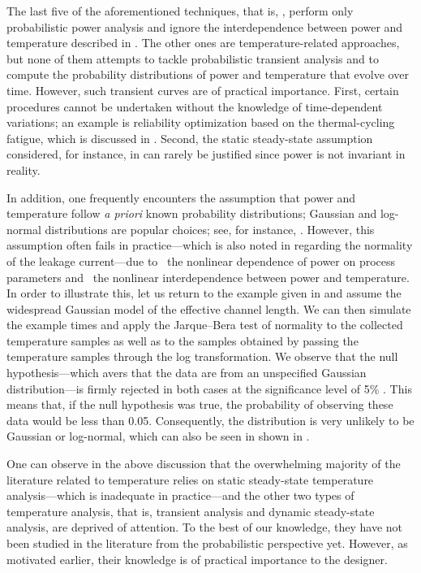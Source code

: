 The last five of the aforementioned techniques, that is, \cite{bhardwaj2006,
vrudhula2006, ghanta2006, bhardwaj2008, shen2009}, perform only probabilistic
power analysis and ignore the interdependence between power and temperature
described in . The other ones are temperature-related
approaches, but none of them attempts to tackle probabilistic transient analysis
and to compute the probability distributions of power and temperature that
evolve over time. However, such transient curves are of practical importance.
First, certain procedures cannot be undertaken without the knowledge of
time-dependent variations; an example is reliability optimization based on the
thermal-cycling fatigue, which is discussed in .
Second, the static steady-state assumption considered, for instance, in
\cite{huang2009a, juan2011, juan2012, lee2013} can rarely be justified since
power is not invariant in reality.

In addition, one frequently encounters the assumption that power and temperature
follow \emph{a priori} known probability distributions; Gaussian and log-normal
distributions are popular choices; see, for instance, \cite{bhardwaj2006,
srivastava2010, juan2012}. However, this assumption often fails in
practice---which is also noted in \cite{juan2012} regarding the normality of the
leakage current---due to \one~the nonlinear dependence of power on process
parameters and \two~the nonlinear interdependence between power and temperature.
In order to illustrate this, let us return to the example given in
 and assume the widespread Gaussian model of the
effective channel length. We can then simulate the example  times
and apply the Jarque--Bera test of normality to the collected temperature
samples as well as to the samples obtained by passing the temperature samples
through the log transformation. We observe that the null hypothesis---which
avers that the data are from an unspecified Gaussian distribution---is firmly
rejected in both cases at the significance level of 5\% \cite{rao2002}. This
means that, if the null hypothesis was true, the probability of observing these
data would be less than 0.05. Consequently, the distribution is very unlikely to
be Gaussian or log-normal, which can also be seen in
 shown in .

One can observe in the above discussion that the overwhelming majority of the
literature related to temperature relies on static steady-state temperature
analysis---which is inadequate in practice---and the other two types of
temperature analysis, that is, transient analysis and dynamic steady-state
analysis, are deprived of attention. To the best of our knowledge, they have not
been studied in the literature from the probabilistic perspective yet. However,
as motivated earlier, their knowledge is of practical importance to the
designer.

